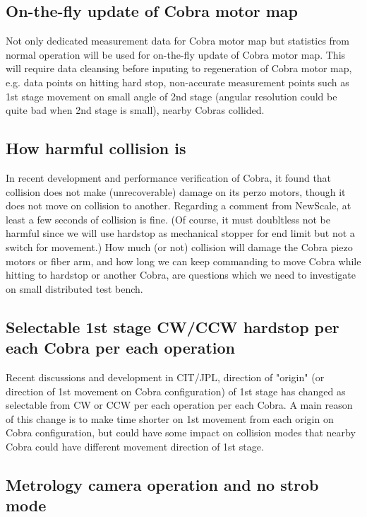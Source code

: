 \documentclass[a4paper,notitlepage]{article}
\begin{document}
\subsection{On-the-fly update of Cobra motor map}

Not only dedicated measurement data for Cobra motor map but statistics from 
normal operation will be used for on-the-fly update of Cobra motor map. This 
will require data cleansing before inputing to regeneration of Cobra motor 
map, e.g. data points on hitting hard stop, non-accurate measurement points 
such as 1st stage movement on small angle of 2nd stage (angular resolution 
could be quite bad when 2nd stage is small), nearby Cobras collided. 

\subsection{How harmful collision is}

In recent development and performance verification of Cobra, it found that 
collision does not make (unrecoverable) damage on its perzo motors, though 
it does not move on collision to another. Regarding a comment from NewScale, 
at least a few seconds of collision is fine. (Of course, it must doubltless 
not be harmful since we will use hardstop as mechanical stopper for end limit 
but not a switch for movement.) How much (or not) collision will damage the 
Cobra piezo motors or fiber arm, and how long we can keep commanding to move 
Cobra while hitting to hardstop or another Cobra, are questions which we 
need to investigate on small distributed test bench.

\subsection{Selectable 1st stage CW/CCW hardstop per each Cobra per each operation}

Recent discussions and development in CIT/JPL, direction of "origin" (or 
direction of 1st movement on Cobra configuration) of 1st stage has changed 
as selectable from CW or CCW per each operation per each Cobra. A main reason 
of this change is to make time shorter on 1st movement from each origin on 
Cobra configuration, but could have some impact on collision modes that 
nearby Cobra could have different movement direction of 1st stage. 

\subsection{Metrology camera operation and no strob mode}
\end{document}
